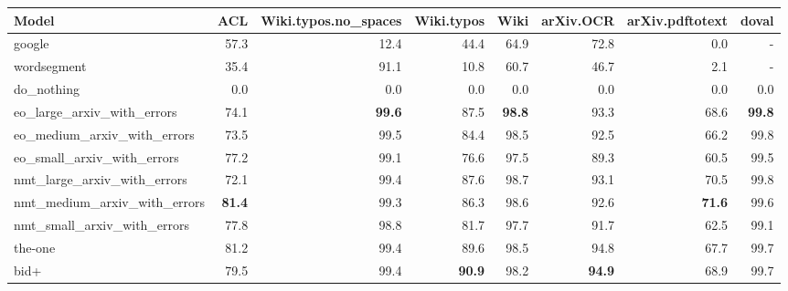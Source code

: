 \begin{tabular}{lrrrrrrr} \hline
Model & ACL & Wiki.typos.no\_spaces & Wiki.typos & Wiki & arXiv.OCR & arXiv.pdftotext & doval \\ \hline
google & 57.3 & 12.4 & 44.4 & 64.9 & 72.8 & 0.0 & - \\ 
wordsegment & 35.4 & 91.1 & 10.8 & 60.7 & 46.7 & 2.1 & - \\ 
do\_nothing & 0.0 & 0.0 & 0.0 & 0.0 & 0.0 & 0.0 & 0.0 \\ \hline
eo\_large\_arxiv\_with\_errors & 74.1 & \textbf{99.6} & 87.5 & \textbf{98.8} & 93.3 & 68.6 & \textbf{99.8} \\ 
eo\_medium\_arxiv\_with\_errors & 73.5 & 99.5 & 84.4 & 98.5 & 92.5 & 66.2 & 99.8 \\ 
eo\_small\_arxiv\_with\_errors & 77.2 & 99.1 & 76.6 & 97.5 & 89.3 & 60.5 & 99.5 \\ \hline
nmt\_large\_arxiv\_with\_errors & 72.1 & 99.4 & 87.6 & 98.7 & 93.1 & 70.5 & 99.8 \\ 
nmt\_medium\_arxiv\_with\_errors & \textbf{81.4} & 99.3 & 86.3 & 98.6 & 92.6 & \textbf{71.6} & 99.6 \\ 
nmt\_small\_arxiv\_with\_errors & 77.8 & 98.8 & 81.7 & 97.7 & 91.7 & 62.5 & 99.1 \\ \hline
the-one & 81.2 & 99.4 & 89.6 & 98.5 & 94.8 & 67.7 & 99.7 \\ 
bid+ & 79.5 & 99.4 & \textbf{90.9} & 98.2 & \textbf{94.9} & 68.9 & 99.7 \\ \hline
\end{tabular}
